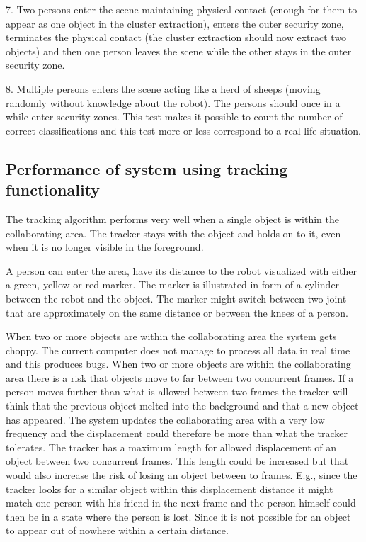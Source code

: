 7. Two persons enter the scene maintaining physical contact (enough for them to appear as one object in the cluster extraction), enters the outer security zone, terminates the physical contact (the cluster extraction should now extract two objects) and then one person leaves the scene while the other stays in the outer security zone.

8. Multiple persons enters the scene acting like a herd of sheeps (moving randomly without knowledge about the robot). The persons should once in a while enter security zones. This test makes it possible to count the number of correct classifications and this test more or less correspond to a real life situation. 

\subsection{Performance of system using tracking functionality}
The tracking algorithm performs very well when a single object is within the collaborating area.
The tracker stays with the object and holds on to it, even when it is no longer visible in the foreground.

A person can enter the area, have its distance to the robot visualized with either a green, yellow or red marker.
The marker is illustrated in form of a cylinder between the robot and the object.
The marker might switch between two joint that are approximately on the same distance or between the knees of a person.

When two or more objects are within the collaborating area the system gets choppy.
The current computer does not manage to process all data in real time and this produces bugs.
When two or more objects are within the collaborating area there is a risk that objects move to far between two concurrent frames.
If a person moves further than what is allowed between two frames the tracker will think that the previous object melted into the background and that a new object has appeared.
The system updates the collaborating area with a very low frequency and the displacement could therefore be more than what the tracker tolerates.
The tracker has a maximum length for allowed displacement of an object between two concurrent frames.
This length could be increased but that would also increase the risk of losing an object between to frames.
E.g., since the tracker looks for a similar object within this displacement distance it might match one person with his friend in the next frame and the person himself could then be in a state where the person is lost. 
Since it is not possible for an object to appear out of nowhere within a certain distance.

